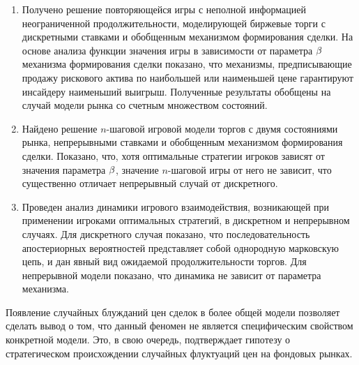 \begin{enumerate}
  \item
    Получено решение повторяющейся игры с неполной информацией неограниченной продолжительности, моделирующей биржевые торги с дискретными ставками и обобщенным механизмом формирования сделки.
    На основе анализа функции значения игры в зависимости от параметра $\beta$ механизма формирования сделки показано, что механизмы, предписывающие продажу рискового актива по наибольшей или наименьшей цене гарантируют инсайдеру наименьший выигрыш.
    Полученные результаты обобщены на случай модели рынка со счетным множеством состояний.
  \item
    Найдено решение $n$-шаговой игровой модели торгов с двумя состояниями рынка, непрерывными ставками и обобщенным механизмом формирования сделки.
    Показано, что, хотя оптимальные стратегии игроков зависят от значения параметра $\beta$, значение $n$-шаговой игры от него не зависит, что существенно отличает непрерывный случай от дискретного.
  \item
    Проведен анализ динамики игрового взаимодействия, возникающей при применении игроками оптимальных стратегий, в дискретном и непрерывном случаях.
    Для дискретного случая показано, что последовательность апостериорных вероятностей представляет собой однородную марковскую цепь, и дан явный вид ожидаемой продолжительности торгов.
    Для непрерывной модели показано, что динамика не зависит от параметра механизма.
\end{enumerate}

Появление случайных блужданий цен сделок в более общей модели позволяет сделать вывод о том, что данный феномен не является специфическим свойством конкретной модели.
Это, в свою очередь, подтверждает гипотезу о стратегическом происхождении случайных флуктуаций цен на фондовых рынках.

